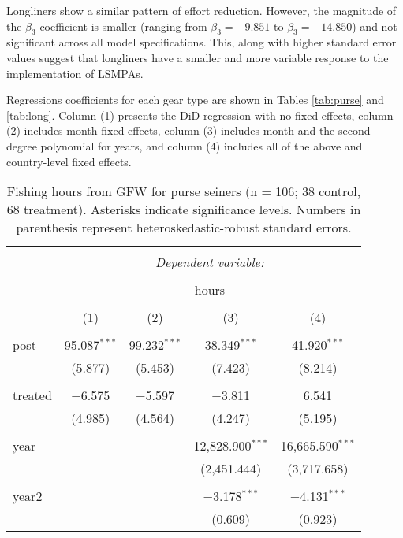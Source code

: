 \documentclass[12pt,]{article}
\begin{document}
Longliners show a similar pattern of effort reduction. However, the
magnitude of the \(\beta_3\) coefficient is smaller (ranging from
\(\beta_3 = -9.851\) to \(\beta_3 = -14.850\)) and not significant
across all model specifications. This, along with higher standard error
values suggest that longliners have a smaller and more variable response
to the implementation of LSMPAs.

Regressions coefficients for each gear type are shown in Tables
\ref{tab:purse} and \ref{tab:long}. Column (1) presents the DiD
regression with no fixed effects, column (2) includes month fixed
effects, column (3) includes month and the second degree polynomial for
years, and column (4) includes all of the above and country-level fixed
effects.

\begin{table}[!htbp] \centering 
  \caption{\label{tab:purse}Fishing hours from GFW for purse seiners (n = 106; 38 control, 68 treatment). Asterisks indicate significance levels. Numbers in parenthesis represent heteroskedastic-robust standard errors.} 
  \label{} 
\begin{tabular}{@{\extracolsep{5pt}}lcccc} 
\\[-1.8ex]\hline 
\hline \\[-1.8ex] 
 & \multicolumn{4}{c}{\textit{Dependent variable:}} \\ 
\cline{2-5} 
\\[-1.8ex] & \multicolumn{4}{c}{hours} \\ 
\\[-1.8ex] & (1) & (2) & (3) & (4)\\ 
\hline \\[-1.8ex] 
 post & 95.087$^{***}$ & 99.232$^{***}$ & 38.349$^{***}$ & 41.920$^{***}$ \\ 
  & (5.877) & (5.453) & (7.423) & (8.214) \\ 
  & & & & \\ 
 treated & $-$6.575 & $-$5.597 & $-$3.811 & 6.541 \\ 
  & (4.985) & (4.564) & (4.247) & (5.195) \\ 
  & & & & \\ 
 year &  &  & 12,828.900$^{***}$ & 16,665.590$^{***}$ \\ 
  &  &  & (2,451.444) & (3,717.658) \\ 
  & & & & \\ 
 year2 &  &  & $-$3.178$^{***}$ & $-$4.131$^{***}$ \\ 
  &  &  & (0.609) & (0.923) \\ 

\end{tabular}
\end{table}
\end{document}
